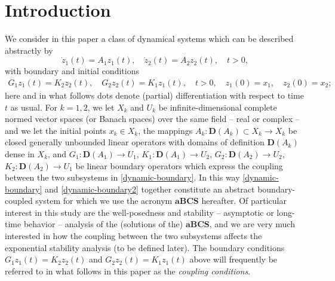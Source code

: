\documentclass[a4paper,11pt,reqno]{amsart}
\theoremstyle{plain}
\numberwithin{equation}{section}
\begin{document}
\section{Introduction}

We consider in this paper a class of dynamical systems which can be described abstractly by
\begin{equation}\label{dynamic-boundary}
\dot{z}_1(t)={{A}}_1 z_1(t),\quad \dot{z}_2(t)={{A}}_2 z_2(t),\quad t>0,
\end{equation}
with boundary and initial conditions
\begin{gather}\label{dynamic-boundary2}
G_1 z_1(t)= K_2 z_2(t),\quad G_2 z_2(t)=K_1 z_1(t),\quad t>0,\quad z_1(0)=x_1,\quad z_2(0)=x_2;
\end{gather}
here and in what follows dots denote (partial) differentiation with respect to time $t$ as usual. For $k=1,2$, we let $X_k$ and $U_k$ be infinite-dimensional complete normed vector spaces (or Banach spaces) over the same field -- real or complex -- and we let the initial points $x_k\in X_k$, the mappings $A_k:\bm{D}({{A}}_k)\subset X_k\to X_k$ be closed generally unbounded linear operators with domains of definition $\bm{D}({A}_k)$ dense in $X_k$, and $ G_1:\bm{D}({A}_1)\to U_1$, $K_1: \bm{D}({A}_1)\to U_2$, $G_2:\bm{D}({A}_2)\to U_2$, $K_2: \bm{D}({A}_2)\to U_1$ be linear boundary operators which express the coupling between the two subsystems in \eqref{dynamic-boundary}. In this way \eqref{dynamic-boundary} and \eqref{dynamic-boundary2} together constitute an abstract boundary-coupled system for which we use the acronym $\mathbf{aBCS}$ hereafter. Of particular interest in this study are the well-posedness and stability -- asymptotic or long-time behavior -- analysis of the (solutions of the) $\mathbf{aBCS}$, and we are very much interested in how the coupling between the two subsystems affects the exponential stability analysis (to be defined later). The boundary conditions $G_1 z_1(t)= K_2 z_2(t)$ and $G_2 z_2(t)=K_1 z_1(t)$ above will frequently be referred to in what follows in this paper as the \textit{coupling conditions}.
\end{document}
